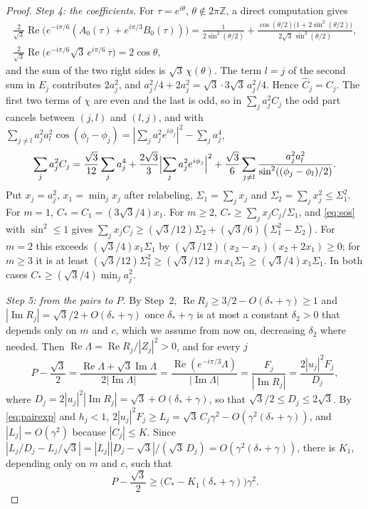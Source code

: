 \documentclass[11pt]{article}
\theoremstyle{definition}
\newcommand{\re}{\operatorname{Re}}
\newcommand{\im}{\operatorname{Im}}
\begin{document}
\begin{proof}
\emph{Step 4: the coefficients.} For $\tau = e^{i\theta}$, $\theta \notin 2\pi\mathbb{Z}$, a direct computation gives
\begin{gather*}
  \frac{2}{\sqrt{3}}\re\bigl(e^{-i\pi/6}(A_0(\tau) + e^{i\pi/3}B_0(\tau))\bigr) = \frac{1}{2\sin^2(\theta/2)} + \frac{\cos(\theta/2)\bigl(1 + 2\sin^2(\theta/2)\bigr)}{2\sqrt{3}\,\sin^3(\theta/2)},\\
  \frac{2}{\sqrt{3}}\re\bigl(e^{-i\pi/6}\sqrt{3}\,e^{i\pi/6}\,\overline{\tau}\bigr) = 2\cos\theta,
\end{gather*}
and the sum of the two right sides is $\sqrt{3}\,\chi(\theta)$. The term $l = j$ of the second sum in $E_j$ contributes $2a_j^2$, and $a_j^2/4 + 2a_j^2 = \sqrt{3}\cdot 3\sqrt{3}\,a_j^2/4$. Hence $\widehat C_j = C_j$. The first two terms of $\chi$ are even and the last is odd, so in $\sum_j a_j^2C_j$ the odd part cancels between $(j, l)$ and $(l, j)$, and with $\sum_{j \ne l} a_j^2a_l^2\cos(\phi_l - \phi_j) = |\sum_j a_j^2e^{i\phi_j}|^2 - \sum_j a_j^4$,
\begin{equation}\label{eq:sos}
  \sum_j a_j^2C_j = \frac{\sqrt{3}}{12}\sum_j a_j^4 + \frac{2\sqrt{3}}{3}\Bigl|\sum_j a_j^2e^{i\phi_j}\Bigr|^2 + \frac{\sqrt{3}}{6}\sum_{j \ne l}\frac{a_j^2a_l^2}{\sin^2((\phi_j - \phi_l)/2)}.
\end{equation}
Put $x_j = a_j^2$, $x_1 = \min_j x_j$ after relabeling, $\Sigma_1 = \sum_j x_j$ and $\Sigma_2 = \sum_j x_j^2 \le \Sigma_1^2$. For $m = 1$, $C_* = C_1 = (3\sqrt{3}/4)x_1$. For $m \ge 2$, $C_* \ge \sum_j x_jC_j/\Sigma_1$, and \eqref{eq:sos} with $\sin^2 \le 1$ gives $\sum_j x_jC_j \ge (\sqrt{3}/12)\Sigma_2 + (\sqrt{3}/6)(\Sigma_1^2 - \Sigma_2)$. For $m = 2$ this exceeds $(\sqrt{3}/4)x_1\Sigma_1$ by $(\sqrt{3}/12)(x_2 - x_1)(x_2 + 2x_1) \ge 0$; for $m \ge 3$ it is at least $(\sqrt{3}/12)\Sigma_1^2 \ge (\sqrt{3}/12)\,m\,x_1\Sigma_1 \ge (\sqrt{3}/4)x_1\Sigma_1$. In both cases $C_* \ge (\sqrt{3}/4)\min_j a_j^2$.

\emph{Step 5: from the pairs to $P$.} By Step~2, $\re R_j \ge 3/2 - O(\delta_* + \gamma) \ge 1$ and $|\im R_j| = \sqrt{3}/2 + O(\delta_* + \gamma)$ once $\delta_* + \gamma$ is at most a constant $\delta_2 > 0$ that depends only on $m$ and $c$, which we assume from now on, decreasing $\delta_2$ where needed. Then $\re\Lambda = \re R_j/|Z_j|^2 > 0$, and for every $j$
\[
  P - \frac{\sqrt{3}}{2} = \frac{\re\Lambda + \sqrt{3}\im\Lambda}{2|\im\Lambda|} = \frac{\re(e^{-i\pi/3}\Lambda)}{|\im\Lambda|} = \frac{F_j}{|\im R_j|} = \frac{2|u_j|^2F_j}{D_j},
\]
where $D_j = 2|u_j|^2|\im R_j| = \sqrt{3} + O(\delta_* + \gamma)$, so that $\sqrt{3}/2 \le D_j \le 2\sqrt{3}$. By \eqref{eq:pairexp} and $h_j < 1$, $2|u_j|^2F_j \ge L_j = \sqrt{3}\,C_j\gamma^2 - O(\gamma^2(\delta_* + \gamma))$, and $|L_j| = O(\gamma^2)$ because $|C_j| \le K$. Since $|L_j/D_j - L_j/\sqrt{3}| = |L_j||D_j - \sqrt{3}|/(\sqrt{3}\,D_j) = O(\gamma^2(\delta_* + \gamma))$, there is $K_1$, depending only on $m$ and $c$, such that
\begin{equation}\label{eq:Pj}
  P - \frac{\sqrt{3}}{2} \ge \bigl(C_* - K_1(\delta_* + \gamma)\bigr)\gamma^2.
\end{equation}


\end{proof}
\end{document}
